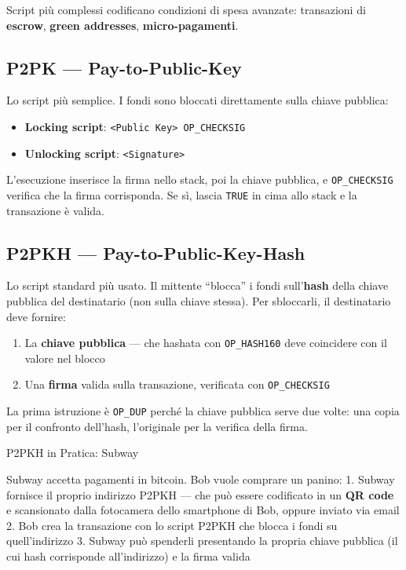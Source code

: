 \documentclass[
  italian,
  openany]{book}
\providecommand{\tightlist}{%
  \setlength{\itemsep}{0pt}\setlength{\parskip}{0pt}}
\begin{document}
Script più complessi codificano condizioni di spesa avanzate:
transazioni di \textbf{escrow}, \textbf{green addresses},
\textbf{micro-pagamenti}.

\subsection{P2PK --- Pay-to-Public-Key}\label{p2pk-pay-to-public-key}

Lo script più semplice. I fondi sono bloccati direttamente sulla chiave
pubblica:

\begin{itemize}
\tightlist
\item
  \textbf{Locking script}:
  \texttt{\textless{}Public\ Key\textgreater{}\ OP\_CHECKSIG}
\item
  \textbf{Unlocking script}: \texttt{\textless{}Signature\textgreater{}}
\end{itemize}

L'esecuzione inserisce la firma nello stack, poi la chiave pubblica, e
\texttt{OP\_CHECKSIG} verifica che la firma corrisponda. Se sì, lascia
\texttt{TRUE} in cima allo stack e la transazione è valida.

\subsection{P2PKH ---
Pay-to-Public-Key-Hash}\label{p2pkh-pay-to-public-key-hash}

Lo script standard più usato. Il mittente ``blocca'' i fondi
sull'\textbf{hash} della chiave pubblica del destinatario (non sulla
chiave stessa). Per sbloccarli, il destinatario deve fornire:

\begin{enumerate}
\def\labelenumi{\arabic{enumi}.}
\tightlist
\item
  La \textbf{chiave pubblica} --- che hashata con \texttt{OP\_HASH160}
  deve coincidere con il valore nel blocco
\item
  Una \textbf{firma} valida sulla transazione, verificata con
  \texttt{OP\_CHECKSIG}
\end{enumerate}

La prima istruzione è \texttt{OP\_DUP} perché la chiave pubblica serve
due volte: una copia per il confronto dell'hash, l'originale per la
verifica della firma.

\begin{callouttip}{P2PKH in Pratica: Subway}

Subway accetta pagamenti in bitcoin. Bob vuole comprare un panino: 1.
Subway fornisce il proprio indirizzo P2PKH --- che può essere codificato
in un \textbf{QR code} e scansionato dalla fotocamera dello smartphone
di Bob, oppure inviato via email 2. Bob crea la transazione con lo
script P2PKH che blocca i fondi su quell'indirizzo 3. Subway può
spenderli presentando la propria chiave pubblica (il cui hash
corrisponde all'indirizzo) e la firma valida

\end{callouttip}
\end{document}

